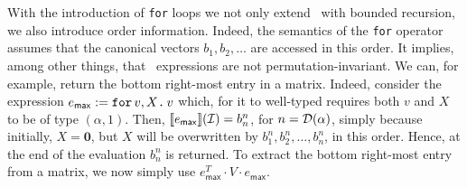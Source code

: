 %
%
With the introduction of \texttt{for} loops we not only extend \lang\ with bounded recursion, we also introduce order information. Indeed, the semantics of the \texttt{for} operator assumes that the canonical vectors $b_1,b_2,\ldots$
are accessed in this order. It implies, among other things, that \langfor\ expressions are not permutation-invariant.
We can, for example, return the bottom right-most entry in a matrix. Indeed, consider the expression $e_{\mathsf{max}} := \texttt{for}\, v,X \texttt{.}\, v$ which, for it to well-typed requires both $v$ and $X$ to be of type $(\alpha,1)$. Then, $\llbracket e_{\mathsf{max}} \rrbracket(\mathcal{I})=b_n^n$, for $n=\mathcal{D}(\alpha)$, simply because initially, $X=\mathbf{0}$, but $X$ will be overwritten by $b_1^n,b_2^n,\ldots,b_n^n$, in this order. Hence, at the end of the evaluation $b_n^n$ is returned.
To extract the bottom right-most entry from a matrix, we now simply use $e_{\mathsf{max}}^T\cdot V\cdot e_{\mathsf{max}}$.


%

